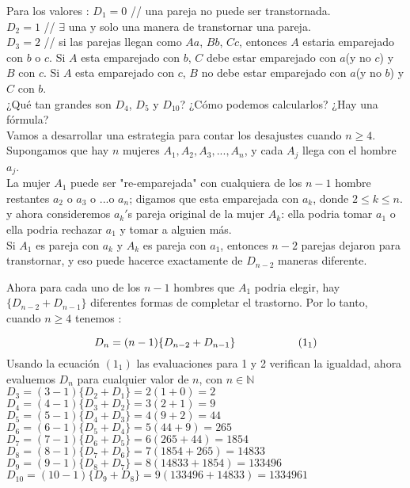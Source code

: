 \documentclass{article}
\begin{document}
Para los valores :\newline
$D_{1} = 0$ \hspace*{0.5cm} // una pareja no puede ser transtornada.\\
$D_{2} = 1$ \hspace*{0.5cm} // $\exists$ una y solo una manera de transtornar una pareja.\\ 
$D_{3} = 2$ \hspace*{0.5cm} // si las parejas llegan como $Aa$, $Bb$, $Cc$, entonces $A$ estaria emparejado con $b$ o $c$. Si $A$ esta emparejado con $b$, $C$ debe estar emparejado con $a$(y no $c$) y $B$ con $c$. Si $A$ esta emparejado con $c$, $B$ no debe estar emparejado con $a$(y no $b$) y $C$ con $b$.\\ \newline
¿Qué tan grandes son $D_{4}$, $D_{5}$ y $D_{10}$? ¿Cómo podemos calcularlos? ¿Hay una fórmula?\\

Vamos a desarrollar una estrategia para contar los desajustes cuando $n \geq 4$. Supongamos que hay $n$ mujeres $A_{1}, A_{2}, A_{3},...,A_{n}$, y cada $A_{j}$ llega con el hombre $a_{j}$.\\

La mujer $A_{1}$ puede ser "re-emparejada" con cualquiera de los $n-1$ hombre restantes $a_{2}$ o $a_{3}$ o ...o $a_{n}$; digamos que esta emparejada con $a_{k}$, donde $2\leq k \leq n.$ y ahora consideremos $a_{k}'$s pareja original de la mujer $A_{k}$: ella podria tomar $a_{1}$ o ella podria rechazar $a_{1}$ y tomar a alguien más.\\

Si $A_{1}$ es pareja con $a_{k}$ y $A_{k}$ es pareja con $a_{1}$, entonces $n-2$ parejas dejaron para transtornar, y eso puede hacerce exactamente de $D_{n-2}$ maneras diferente.

Ahora para cada uno de los $n-1$ hombres que $A_{1}$ podria elegir, hay $\{D_{n-2}+ D_{n-1}\}$ diferentes formas de completar el trastorno. Por lo tanto, cuando $n \geq 4$ tenemos :


$$ D_{n} = (n-1)\{ D_{n-2} + D_{n-1}\} \hspace*{2cm} (1_1) $$ 
Usando la ecuación $(1_1)$ las evaluaciones para 1 y 2 verifican la igualdad, ahora evaluemos $D_{n}$ para cualquier valor de $n$, con $n \in \mathbb{N}$\\ \newline
$D_{3} = (3 - 1)\{D_{2} + D_{1}\} = 2(1 + 0) = 2$\\
$D_{4} = (4 - 1)\{D_{3} + D_{2}\} = 3(2 + 1) = 9$\\
$D_{5} = (5 - 1)\{D_{4} + D_{3}\} = 4(9 + 2) = 44$\\
$D_{6} = (6 - 1)\{D_{5} + D_{4}\} = 5(44 + 9) = 265$\\
$D_{7} = (7 - 1)\{D_{6} + D_{5}\} = 6(265 + 44) = 1854$\\
$D_{8} = (8 - 1)\{D_{7} + D_{6}\} = 7(1854 + 265) = 14833$\\
$D_{9} = (9 - 1)\{D_{8} + D_{7}\} = 8(14833 + 1854) = 133496$\\
$D_{10}= (10 - 1)\{D_{9} + D_{8}\} = 9(133496 + 14833) = 1334961$\\
\end{document}
